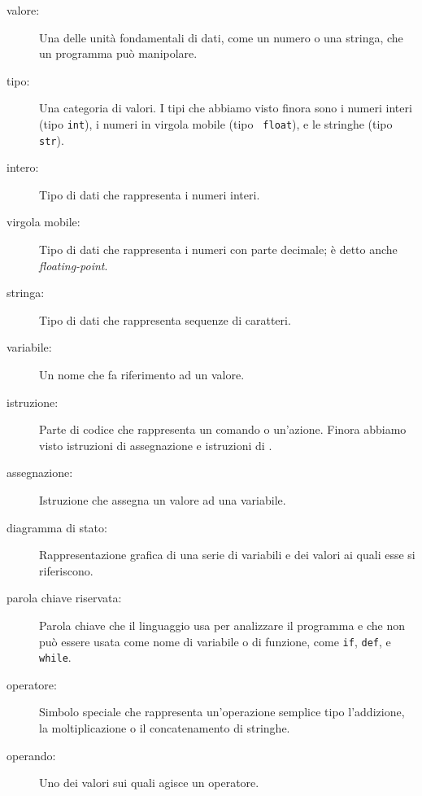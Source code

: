 \documentclass[10pt]{book}
\begin{document}
\begin{description}

\item[valore:]  Una delle unità fondamentali di dati, come un numero o una stringa, che un programma può manipolare.

\item[tipo:] Una categoria di valori. I tipi che abbiamo visto finora sono i numeri interi (tipo {\tt int}), i numeri in virgola mobile (tipo {\tt
float}), e le stringhe (tipo {\tt str}).

\item[intero:] Tipo di dati che rappresenta i numeri interi.

\item[virgola mobile:] Tipo di dati che rappresenta i numeri con parte decimale; è detto anche {\em floating-point}.

\item[stringa:] Tipo di dati che rappresenta sequenze di caratteri.

\item[variabile:]  Un nome che fa riferimento ad un valore.

\item[istruzione:]  Parte di codice che rappresenta un comando o un'azione.    Finora abbiamo visto istruzioni di assegnazione e istruzioni di .

\item[assegnazione:]  Istruzione che assegna un valore ad una variabile.

\item[diagramma di stato:]  Rappresentazione grafica di una serie di variabili e dei valori ai quali esse si riferiscono.

\item[parola chiave riservata:]  Parola chiave che il linguaggio usa per analizzare il programma e che non può essere usata come nome di variabile o di funzione, come {\tt if}, {\tt  def}, e {\tt while}.

\item[operatore:]  Simbolo speciale che rappresenta un'operazione semplice tipo
          l'addizione, la moltiplicazione o il concatenamento di stringhe.

\item[operando:]  Uno dei valori sui quali agisce un operatore.


\end{description}
\end{document}
